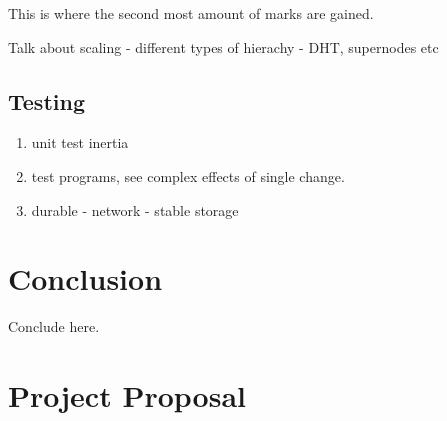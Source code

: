 \documentclass[12pt,twoside,notitlepage]{report}
\begin{document}
This is where the second most amount of marks are gained.

Talk about scaling - different types of hierachy - DHT, supernodes etc

\section{Testing}

\begin{enumerate}
	\item unit test inertia
	\item test programs, see complex effects of single change.
	\item durable - network - stable storage
\end{enumerate}



\cleardoublepage
\chapter{Conclusion}

Conclude here.




\cleardoublepage



\cleardoublepage

\appendix

\chapter{Project Proposal}


\end{document}
